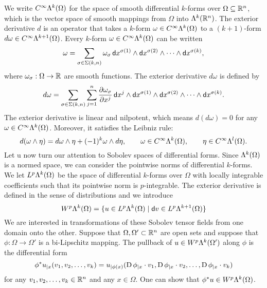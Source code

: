 \documentclass[a4paper]{article}
\begin{document}
We write $C^{\infty}\Lambda^{k}(\Omega)$ for the space of smooth differential $k$-forms over $\Omega \subseteq {\mathbb R}^{n}$,
which is the vector space of smooth mappings from $\Omega$ into $\Lambda^{k}({\mathbb R}^{n})$.
The exterior derivative \( d \) is an operator that takes a \( k \)-form \( \omega \in C^{\infty}\Lambda^{k}(\Omega) \) 
to a \((k+1)\)-form \( d\omega \in C^{\infty}\Lambda^{k+1}(\Omega) \). 
Every \( k \)-form \( \omega \in C^{\infty}\Lambda^{k}(\Omega) \) can be written 
\[
    \omega = 
    \sum_{ \sigma \in \Sigma(k,n) } 
    \omega_{\sigma} \, 
    {\mathsf d}x^{\sigma(1)} \wedge {\mathsf d}x^{\sigma(2)} \wedge \cdots \wedge {\mathsf d}x^{\sigma(k)},
\]
where \( \omega_{\sigma} : \Omega \rightarrow {\mathbb R} \) are smooth functions.
The exterior derivative \( d\omega \) is defined by
\[
    d\omega = 
    \sum_{ \sigma \in \Sigma(k,n) } 
    \sum_{j=1}^{n} 
    \frac{\partial \omega_{\sigma}}{\partial x^j} 
    \, {\mathsf d}x^j \wedge 
    {\mathsf d}x^{\sigma(1)} \wedge {\mathsf d}x^{\sigma(2)} \wedge \cdots \wedge {\mathsf d}x^{\sigma(k)}.
\]
The exterior derivative is linear and nilpotent, which means 
\( d(d\omega) = 0 \) for any \( \omega \in C^{\infty}\Lambda^{k}(\Omega) \).
Moreover, it satisfies the Leibniz rule:
\[ 
    d(\omega \wedge \eta) 
    = 
    d\omega \wedge \eta + (-1)^{k} \omega \wedge d\eta, 
    \qquad \omega \in C^{\infty}\Lambda^{k}(\Omega), 
    \qquad \eta \in C^{\infty}\Lambda^{l}(\Omega).
\]
Let u now turn our attention to Sobolev spaces of differential forms. 
Since $\Lambda^{k}(\Omega)$ is a normed space, we can consider the pointwise norms of differential $k$-forms. 
We let $L^{p}\Lambda^{k}(\Omega)$ be the space of differential $k$-forms over $\Omega$ with locally integrable coefficients 
such that its pointwise norm is $p$-integrable. 
The exterior derivative is defined in the sense of distributions and we introduce 
\[
    W^p\Alt^{k}(\Omega) = \{ u \in L^{p}\Alt^{k}(\Omega) \suchthat \cartan v \in L^{p}\Alt^{k+1}(\Omega) \}
\]
We are interested in transformations of these Sobolev tensor fields from one domain onto the other. 
Suppose that $\Omega,\Omega' \subset {\mathbb R}^{n}$ are open sets and suppose that $\phi: \Omega \to \Omega'$ is a bi-Lipschitz mapping.
The pullback of $u \in W^p\Lambda^{k}(\Omega')$ along $\phi$ is the differential form 
\[ 
    \phi^{\ast}u_{|x}( v_{1}, v_{2}, \ldots, v_{k} ) 
    = 
    u_{|\phi(x)}( \operatorname{D}\phi_{|x} \cdot v_1, \operatorname{D}\phi_{|x} \cdot v_2, \ldots, \operatorname{D}\phi_{|x} \cdot v_k ) 
\]
for any $v_1, v_2, \dots, v_k \in {\mathbb R}^{n}$ and any $x \in \Omega$. One can show that $\phi^{\ast}u \in W^p\Lambda^{k}(\Omega)$.
\end{document}
